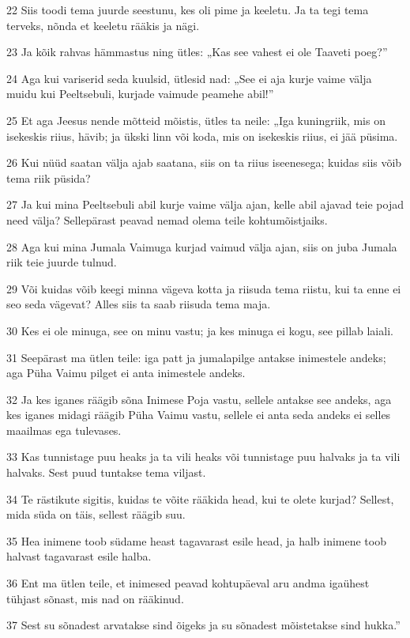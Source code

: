 \par 22 Siis toodi tema juurde seestunu, kes oli pime ja keeletu. Ja ta tegi tema terveks, nõnda et keeletu rääkis ja nägi.
\par 23 Ja kõik rahvas hämmastus ning ütles: „Kas see vahest ei ole Taaveti poeg?”
\par 24 Aga kui variserid seda kuulsid, ütlesid nad: „See ei aja kurje vaime välja muidu kui Peeltsebuli, kurjade vaimude peamehe abil!”
\par 25 Et aga Jeesus nende mõtteid mõistis, ütles ta neile: „Iga kuningriik, mis on isekeskis riius, hävib; ja ükski linn või koda, mis on isekeskis riius, ei jää püsima.
\par 26 Kui nüüd saatan välja ajab saatana, siis on ta riius iseenesega; kuidas siis võib tema riik püsida?
\par 27 Ja kui mina Peeltsebuli abil kurje vaime välja ajan, kelle abil ajavad teie pojad need välja? Sellepärast peavad nemad olema teile kohtumõistjaiks.
\par 28 Aga kui mina Jumala Vaimuga kurjad vaimud välja ajan, siis on juba Jumala riik teie juurde tulnud.
\par 29 Või kuidas võib keegi minna vägeva kotta ja riisuda tema riistu, kui ta enne ei seo seda vägevat? Alles siis ta saab riisuda tema maja.
\par 30 Kes ei ole minuga, see on minu vastu; ja kes minuga ei kogu, see pillab laiali.
\par 31 Seepärast ma ütlen teile: iga patt ja jumalapilge antakse inimestele andeks; aga Püha Vaimu pilget ei anta inimestele andeks.
\par 32 Ja kes iganes räägib sõna Inimese Poja vastu, sellele antakse see andeks, aga kes iganes midagi räägib Püha Vaimu vastu, sellele ei anta seda andeks ei selles maailmas ega tulevases.
\par 33 Kas tunnistage puu heaks ja ta vili heaks või tunnistage puu halvaks ja ta vili halvaks. Sest puud tuntakse tema viljast.
\par 34 Te rästikute sigitis, kuidas te võite rääkida head, kui te olete kurjad? Sellest, mida süda on täis, sellest räägib suu.
\par 35 Hea inimene toob südame heast tagavarast esile head, ja halb inimene toob halvast tagavarast esile halba.
\par 36 Ent ma ütlen teile, et inimesed peavad kohtupäeval aru andma igaühest tühjast sõnast, mis nad on rääkinud.
\par 37 Sest su sõnadest arvatakse sind õigeks ja su sõnadest mõistetakse sind hukka.”

